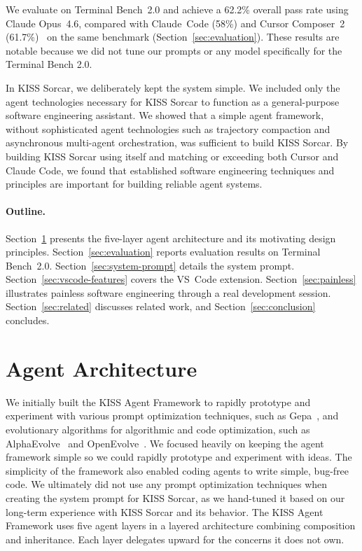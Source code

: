 \documentclass{article}
\begin{document}
We evaluate on Terminal Bench~2.0 and achieve a 62.2\% overall pass rate using Claude Opus~4.6, compared with Claude~Code (58\%) and Cursor Composer~2 (61.7\%)~\citep{cursor2026composer2} on the same benchmark (Section~\ref{sec:evaluation}).  These results are notable because we did not tune our prompts or any model specifically for the Terminal Bench 2.0.

In KISS Sorcar, we deliberately kept the system simple.  We included only the agent technologies necessary for KISS Sorcar to function as a general-purpose software engineering assistant. We showed that a simple agent framework, without sophisticated agent technologies such as trajectory compaction and asynchronous multi-agent orchestration, was sufficient to build KISS Sorcar.  By building KISS Sorcar using itself and matching or exceeding both Cursor and Claude Code, we found that established software engineering techniques and principles are important for building reliable agent systems.

\paragraph{Outline.}
Section~\ref{sec:architecture} presents the five-layer agent architecture and its motivating design principles. Section~\ref{sec:evaluation} reports evaluation results on Terminal Bench~2.0.  Section~\ref{sec:system-prompt} details the system prompt. Section~\ref{sec:vscode-features} covers the VS~Code extension. Section~\ref{sec:painless} illustrates painless software engineering through a real development session. Section~\ref{sec:related} discusses related work, and Section~\ref{sec:conclusion} concludes.

\section{Agent Architecture}
\label{sec:architecture}

We initially built the KISS Agent Framework to rapidly prototype and experiment with various prompt optimization techniques, such as Gepa~\citep{agrawal2025gepa}, and evolutionary algorithms for algorithmic and code optimization, such as AlphaEvolve~\citep{novikov2025alphaevolve} and OpenEvolve~\citep{openevolve2025}. We focused heavily on keeping the agent framework simple so we could rapidly prototype and experiment with ideas.  The simplicity of the framework also enabled coding agents to write simple, bug-free code.  We ultimately did not use any prompt optimization techniques when creating the system prompt for KISS Sorcar, as we hand-tuned it based on our long-term experience with KISS Sorcar and its behavior.  The KISS Agent Framework uses five agent layers in a layered architecture combining composition and inheritance. Each layer delegates upward for the concerns it does not own.
\end{document}
